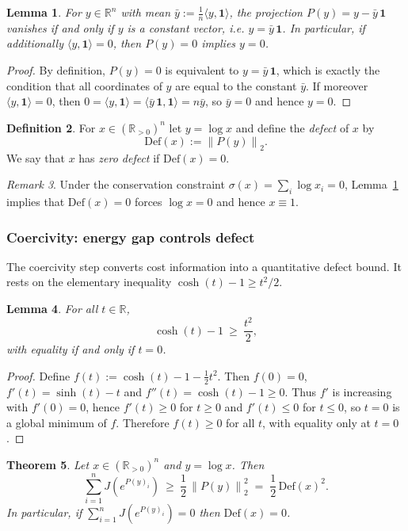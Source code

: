 \documentclass[11pt,reqno]{amsart}
\newtheorem{theorem}{Theorem}[section]
\newtheorem{lemma}[theorem]{Lemma}
\theoremstyle{definition}
\newtheorem{definition}[theorem]{Definition}
\theoremstyle{remark}
\newtheorem{remark}[theorem]{Remark} %
\newcommand{\R}{\mathbb{R}}
\newcommand{\Rp}{\mathbb{R}_{>0}}
\newcommand{\1}{\mathbf{1}}
\newcommand{\norm}[1]{\left\lVert #1 \right\rVert}
\begin{document}
\begin{lemma}\label{lem:Pkernel}
For $y\in\R^n$ with mean $\bar y:=\frac1n\langle y,\mathbf 1\rangle$, the projection $P(y)=y-\bar y\,\mathbf 1$
vanishes if and only if $y$ is a constant vector, i.e. $y=\bar y\,\mathbf 1$.
In particular, if additionally $\langle y,\mathbf 1\rangle=0$, then $P(y)=0$ implies $y=0$.
\end{lemma}

\begin{proof}
By definition, $P(y)=0$ is equivalent to $y=\bar y\,\mathbf 1$, which is exactly the condition that all coordinates
of $y$ are equal to the constant $\bar y$.
If moreover $\langle y,\mathbf 1\rangle=0$, then $0=\langle y,\mathbf 1\rangle=\langle \bar y\,\mathbf 1,\mathbf 1\rangle=n\bar y$,
so $\bar y=0$ and hence $y=0$.
\end{proof}


\begin{definition}\label{def:defect}
For $x\in(\Rp)^n$ let $y=\log x$ and define the \emph{defect} of $x$ by
\[
\mathrm{Def}(x):=\norm{P(y)}_2.
\]
We say that $x$ has \emph{zero defect} if $\mathrm{Def}(x)=0$.
\end{definition}

\begin{remark}
Under the conservation constraint $\sigma(x)=\sum_i \log x_i=0$,
Lemma~\ref{lem:Pkernel} implies that $\mathrm{Def}(x)=0$ forces $\log x=0$ and hence $x\equiv 1$.
\end{remark}

\subsubsection{Coercivity: energy gap controls defect}\label{sec:coercivity} The coercivity step converts cost information into a quantitative defect bound. It rests on the
elementary inequality $\cosh(t)-1\geq t^2/2$. \begin{lemma}\label{lem:coshcoercive}
For all $t\in\R$,
\[
\cosh(t)-1\ \geq\ \frac{t^2}{2},
\]
with equality if and only if $t=0$.
\end{lemma}

\begin{proof}
Define $f(t):=\cosh(t)-1-\tfrac12 t^2$. Then $f(0)=0$, $f'(t)=\sinh(t)-t$ and
$f''(t)=\cosh(t)-1\geq 0$. Thus $f'$ is increasing with $f'(0)=0$, hence $f'(t)\geq 0$ for $t\geq 0$
and $f'(t)\leq 0$ for $t\le 0$, so $t=0$ is a global minimum of $f$. Therefore $f(t)\geq 0$ for all $t$,
with equality only at $t=0$.
\end{proof} \begin{theorem}\label{thm:coercive}
Let $x\in(\Rp)^n$ and $y=\log x$. Then
\begin{equation}\label{eq:coercive}
\sum_{i=1}^n J\!\left(e^{P(y)_i}\right)\ \geq\ \frac12\,\norm{P(y)}_2^2 \;=\;\frac12\,\mathrm{Def}(x)^2.
\end{equation}
In particular, if $\sum_{i=1}^n J\!\left(e^{P(y)_i}\right)=0$ then $\mathrm{Def}(x)=0$.
\end{theorem}
\end{document}
